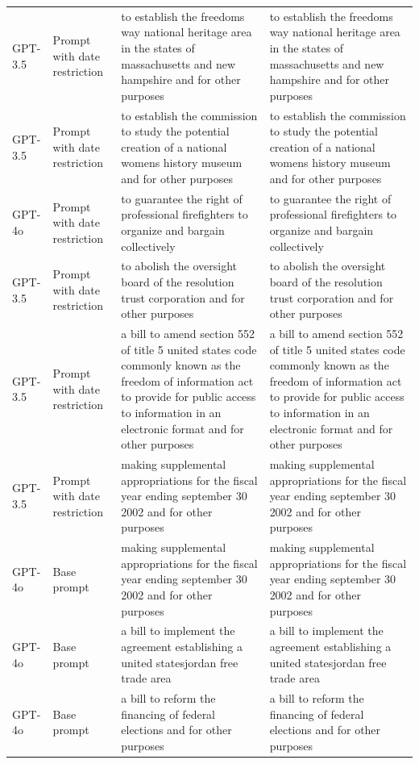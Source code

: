 \begin{longtable}{>{\raggedright\arraybackslash}p{1.4cm}>{\raggedright\arraybackslash}p{1.4cm}>{\raggedright\arraybackslash}p{5.5cm}>{\raggedright\arraybackslash}p{5.5cm}}
GPT-3.5 & Prompt with date restriction & to establish the freedoms way national heritage area in the states of massachusetts and new hampshire and for other purposes & to establish the freedoms way national heritage area in the states of massachusetts and new hampshire and for other purposes\\
GPT-3.5 & Prompt with date restriction & to establish the commission to study the potential creation of a national womens history museum and for other purposes & to establish the commission to study the potential creation of a national womens history museum and for other purposes\\
GPT-4o & Prompt with date restriction & to guarantee the right of professional firefighters to organize and bargain collectively & to guarantee the right of professional firefighters to organize and bargain collectively\\
GPT-3.5 & Prompt with date restriction & to abolish the oversight board of the resolution trust corporation and for other purposes & to abolish the oversight board of the resolution trust corporation and for other purposes\\
GPT-3.5 & Prompt with date restriction & a bill to amend section 552 of title 5 united states code commonly known as the freedom of information act to provide for public access to information in an electronic format and for other purposes & a bill to amend section 552 of title 5 united states code commonly known as the freedom of information act to provide for public access to information in an electronic format and for other purposes\\
GPT-3.5 & Prompt with date restriction & making supplemental appropriations for the fiscal year ending september 30 2002 and for other purposes & making supplemental appropriations for the fiscal year ending september 30 2002 and for other purposes\\
GPT-4o & Base prompt & making supplemental appropriations for the fiscal year ending september 30 2002 and for other purposes & making supplemental appropriations for the fiscal year ending september 30 2002 and for other purposes\\
GPT-4o & Base prompt & a bill to implement the agreement establishing a united statesjordan free trade area & a bill to implement the agreement establishing a united statesjordan free trade area\\
GPT-4o & Base prompt & a bill to reform the financing of federal elections and for other purposes & a bill to reform the financing of federal elections and for other purposes\\

\end{longtable}
